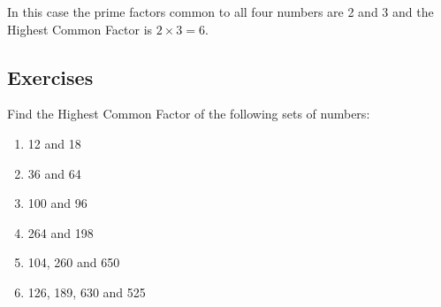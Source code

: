 \documentclass[11pt, oneside]{article}
\theoremstyle{definition}
\begin{document}
In this case the prime factors common to all four numbers are 2 and 3 and the Highest Common Factor is $2\times 3 = 6$.


\subsection{Exercises}
Find the Highest Common Factor of the following sets of numbers:
\begin{enumerate}
\item 12 and 18
\item 36 and 64
\item 100 and 96
\item 264 and 198
\item 104, 260 and 650
\item 126, 189, 630 and 525
\end{enumerate}
\end{document}
